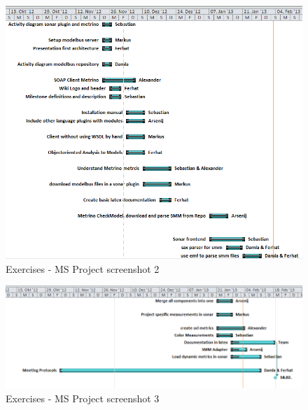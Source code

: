 \begin{figure}[htb]
\begin{center}
\includegraphics[width=\textwidth]{msp_part2}
\caption{Exercises - MS Project screenshot 2}
\end{center}
\end{figure}

\newpage

\begin{figure}[htb]
\begin{center}
\includegraphics[width=\textwidth]{msp_part3}
\caption{Exercises - MS Project screenshot 3}
\end{center}
\end{figure}

